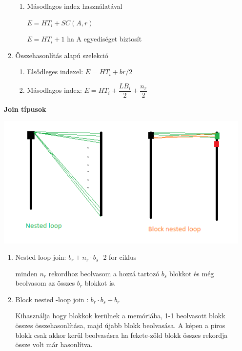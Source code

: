 \begin{enumerate}
\begin{enumerate}
\begin{enumerate}
						\item Másodlagos index használatával

							\forceindent $E = HT_i + SC(A,r)$

							\forceindent $E = HT_i + 1$ ha A egyediséget biztosít

					\end{enumerate}

				\item Összehasonlítás alapú szelekció

					\begin{enumerate}
						\item Elsődleges indexel: $E = HT_i + br/2$

						\item Másodlagos index: $ E = HT_i + \dfrac{LB_i}{2} + \dfrac{n_r}{2}$
					\end{enumerate}

			\end{enumerate}


				\textbf{Join típusok}
					\begin{center}
						\includegraphics[scale=0.7]{img/JoinTypes}
					\end{center}

					\begin{enumerate}
						\item Nested-loop join:  $b_r + n_r \cdot b_s$\quad -  2 for ciklus

								\forceindent minden $n_r$ rekordhoz beolvasom a hozzá tartozó $b_s$ blokkot és még beolvasom az összes $b_r$ blokkot is.

						\item Block nested -loop join : $b_r \cdot b_s + b_r$

							\forceindent Kihasználja hogy blokkok kerülnek a memóriába, 1-1 beolvasott blokk összes összehasonlítása, majd újabb blokk beolvasása. A képen a piros blokk csak akkor kerül beolvasásra ha fekete-zöld blokk összes rekordja össze volt már hasonlítva.


\end{enumerate}
\end{enumerate}
